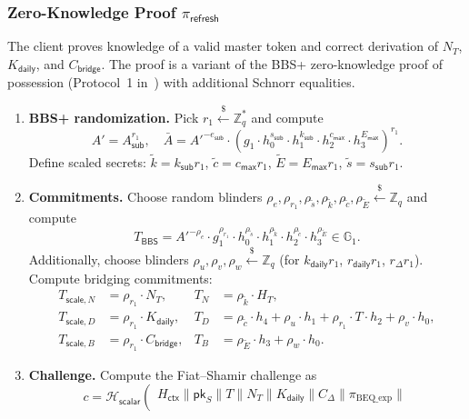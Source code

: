 \documentclass[11pt]{article}
\theoremstyle{definitionstyle}
\theoremstyle{plain}
\begin{document}
\subsubsection[Zero-Knowledge Proof pi refresh]{Zero-Knowledge Proof $\pi_{\mathsf{refresh}}$}
The client proves knowledge of a valid master token and correct derivation of $N_T$, $K_{\mathsf{daily}}$, and $C_{\mathsf{bridge}}$. The proof is a variant of the BBS+ zero-knowledge proof of possession (Protocol~1 in~\cite{act}) with additional Schnorr equalities.

\begin{enumerate}[leftmargin=*]
\item \textbf{BBS+ randomization.}
  Pick $r_1 \xleftarrow{\$} \mathbb{Z}_q^*$ and compute
  \[
  A' = A_{\mathsf{sub}}^{r_1}, \quad
  \bar{A} = A'^{-e_{\mathsf{sub}}} \cdot \left( g_1 \cdot h_0^{s_{\mathsf{sub}}} \cdot h_1^{k_{\mathsf{sub}}} \cdot h_2^{c_{\mathsf{max}}} \cdot h_3^{E_{\mathsf{max}}} \right)^{r_1}.
  \]
  Define scaled secrets: $\tilde{k} = k_{\mathsf{sub}} r_1$, $\tilde{c} = c_{\mathsf{max}} r_1$, $\tilde{E} = E_{\mathsf{max}} r_1$, $\tilde{s} = s_{\mathsf{sub}} r_1$.
\item \textbf{Commitments.}
  Choose random blinders $\rho_e, \rho_{r_1}, \rho_{\tilde{s}}, \rho_{\tilde{k}}, \rho_{\tilde{c}}, \rho_{\tilde{E}} \xleftarrow{\$} \mathbb{Z}_q$ and compute
  \[
  T_{\mathsf{BBS}} = A'^{-\rho_e} \cdot g_1^{\rho_{r_1}} \cdot h_0^{\rho_{\tilde{s}}} \cdot h_1^{\rho_{\tilde{k}}} \cdot h_2^{\rho_{\tilde{c}}} \cdot h_3^{\rho_{\tilde{E}}} \in \mathbb{G}_1.
  \]
  Additionally, choose blinders $\rho_u, \rho_v, \rho_w \xleftarrow{\$} \mathbb{Z}_q$ (for $k_{\mathsf{daily}} r_1$, $r_{\mathsf{daily}} r_1$, $r_{\Delta} r_1$).
  Compute bridging commitments:
  \begin{align*}
    T_{\mathsf{scale},N} &= \rho_{r_1} \cdot N_T, & T_N &= \rho_{\tilde{k}} \cdot H_T, \\
    T_{\mathsf{scale},D} &= \rho_{r_1} \cdot K_{\mathsf{daily}}, & T_D &= \rho_{\tilde{c}} \cdot h_4 + \rho_u \cdot h_1 + \rho_{r_1} \cdot T \cdot h_2 + \rho_v \cdot h_0, \\
    T_{\mathsf{scale},B} &= \rho_{r_1} \cdot C_{\mathsf{bridge}}, & T_B &= \rho_{\tilde{E}} \cdot h_3 + \rho_w \cdot h_0.
  \end{align*}
\item \textbf{Challenge.}
  Compute the Fiat--Shamir challenge as
  \[
  c = \mathcal{H}_{\mathsf{scalar}}\left(
  \begin{array}{c}
  H_{\mathsf{ctx}} \parallel \mathsf{pk}_S \parallel T \parallel N_T \parallel K_{\mathsf{daily}} \parallel C_{\Delta} \parallel \pi_{\text{BEQ\_exp}} \parallel \\

\end{array}\]
\end{enumerate}
\end{document}
